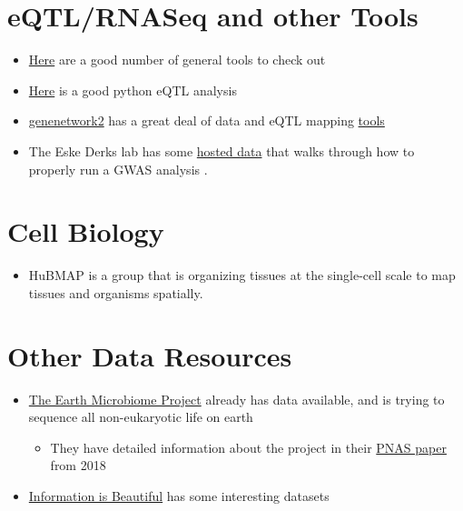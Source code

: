 \documentclass[]{book}
\providecommand{\tightlist}{%
  \setlength{\itemsep}{0pt}\setlength{\parskip}{0pt}}
\begin{document}
\section{eQTL/RNASeq and other Tools}\label{eqtlrnaseq-and-other-tools}

\begin{itemize}
\tightlist
\item
  \href{https://adinasarapu.github.io/year-archive/}{Here} are a good
  number of general tools to check out
\item
  \href{https://github.com/molgenis/systemsgenetics/wiki/eQTL-mapping-analysis-cookbook-for-RNA-seq-data}{Here}
  is a good python eQTL analysis
\item
  \href{http://gn2.genenetwork.org/}{genenetwork2} has a great deal of
  data and eQTL mapping
  \href{https://github.com/genenetwork/genenetwork2}{tools}
\item
  The Eske Derks lab has some
  \href{https://github.com/MareesAT/GWA_tutorial/}{hosted data} that
  walks through how to properly run a GWAS analysis
  \citep{Marees2018-rc}.
\end{itemize}

\section{Cell Biology}\label{cell-biology}

\begin{itemize}
\tightlist
\item
  HuBMAP is a group that is organizing tissues at the single-cell scale
  to map tissues and organisms spatially.
\end{itemize}

\section{Other Data Resources}\label{other-data-resources}

\begin{itemize}
\tightlist
\item
  \href{http://www.earthmicrobiome.org/data-and-code/}{The Earth
  Microbiome Project} already has data available, and is trying to
  sequence all non-eukaryotic life on earth

  \begin{itemize}
  \tightlist
  \item
    They have detailed information about the project in their
    \href{http://www.pnas.org/content/115/17/4325.long}{PNAS paper} from
    2018
  \end{itemize}
\item
  \href{https://informationisbeautiful.net/}{Information is Beautiful}
  has some interesting datasets
\end{itemize}


\end{document}
